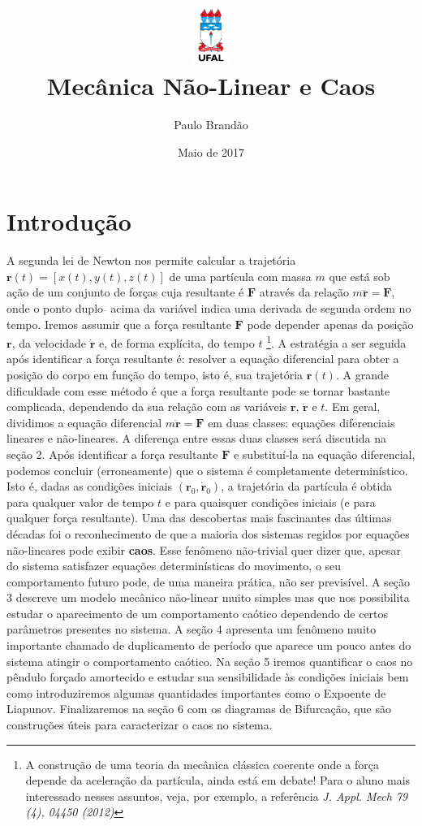 \documentclass{article}
\title{\includegraphics[width=0.1\textwidth]{ufallogo.png} \\\Huge{\color{astral}\textbf{Mecânica Não-Linear e Caos}}}
\author{Paulo Brandão}
\date{Maio de 2017}
\begin{document}
\maketitle

\section{Introdução}

A segunda lei de Newton nos permite calcular a trajetória $\mathbf{r}(t) = [x(t),y(t),z(t)]$ de uma partícula com massa $m$ que está sob ação de um conjunto de forças cuja resultante é $\mathbf{F}$ através da relação $m\ddot{\mathbf{r}} = \mathbf{F}$, onde o ponto duplo $\ddot{ }$ acima da variável indica uma derivada de segunda ordem no tempo. Iremos assumir que a força resultante $\mathbf{F}$ pode depender apenas da posição $\mathbf{r}$, da velocidade $\mathbf{\dot{r}}$ e, de forma explícita, do tempo $t$ \footnote{A construção de uma teoria da mecânica clássica coerente onde a força depende da aceleração da partícula, ainda está em debate! Para o aluno mais interessado nesses assuntos, veja, por exemplo, a referência \textit{J. Appl. Mech 79 (4), 04450 (2012)}}. A estratégia a ser seguida após identificar a força resultante é: resolver a equação diferencial para obter a posição do corpo em função do tempo, isto é, sua trajetória $\mathbf{r}(t)$. A grande dificuldade com esse método é que a força resultante pode se tornar bastante complicada, dependendo da sua relação com as variáveis $\mathbf{r}$, $\mathbf{\dot{r}}$ e $t$. Em geral, dividimos a equação diferencial $m\ddot{\mathbf{r}} = \mathbf{F}$ em duas classes: equações diferenciais lineares e não-lineares. A diferença entre essas duas classes será discutida na seção 2. Após identificar a força resultante $\mathbf{F}$ e substituí-la na equação diferencial, podemos concluir (erroneamente) que o sistema é completamente determinístico. Isto é, dadas as condições iniciais $(\mathbf{r}_0,\mathbf{\dot{r}}_0)$, a trajetória da partícula é obtida para qualquer valor de tempo $t$ e para quaisquer condições iniciais (e para qualquer força resultante). Uma das descobertas mais fascinantes das últimas décadas foi o reconhecimento de que a maioria dos sistemas regidos por equações não-lineares pode exibir \textbf{caos}. Esse fenômeno não-trivial quer dizer que, apesar do sistema satisfazer equações determinísticas do movimento, o seu comportamento futuro pode, de uma maneira prática, não ser previsível. A seção 3 descreve um modelo mecânico não-linear muito simples mas que nos possibilita estudar o aparecimento de um comportamento caótico dependendo de certos parâmetros presentes no sistema. A seção 4 apresenta um fenômeno muito importante chamado de duplicamento de período que aparece um pouco antes do sistema atingir o comportamento caótico. Na seção 5 iremos quantificar o caos no pêndulo forçado amortecido e estudar sua sensibilidade às condições iniciais bem como introduziremos algumas quantidades importantes como o Expoente de Liapunov. Finalizaremos na seção 6 com os diagramas de Bifurcação, que são construções úteis para caracterizar o caos no sistema.
\end{document}

